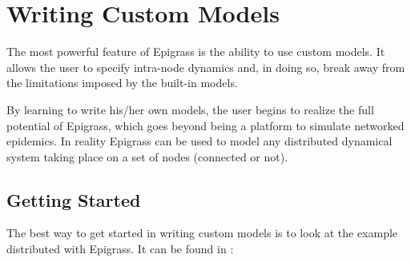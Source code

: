 \documentclass[a4paper,10pt]{manual}
\begin{document}
\resetcurrentobjects

\resetcurrentobjects


\hypertarget{custom}{}\chapter{Writing Custom Models}
The most powerful feature of Epigrass is the ability to use custom
models. It allows the user to specify intra-node dynamics and, in
doing so, break away from the limitations imposed by the built-in
models.

By learning to write his/her own models, the user begins to realize
the full potential of Epigrass, which goes beyond being a platform to
simulate networked epidemics. In reality Epigrass can be used to model
any distributed dynamical system taking place on a set of nodes
(connected or not).


\section{Getting Started}

The best way to get started in writing custom models is to look at the
example distributed with Epigrass. It can be found in
:
\end{document}
